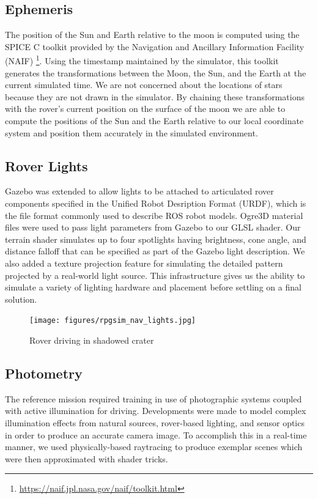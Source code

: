 \documentclass[twocolumn,letterpaper]{IEEEAerospaceCLS}  %
\begin{document}
\subsection{Ephemeris}
The position of the Sun and Earth relative to the moon is computed using the SPICE C toolkit provided by the Navigation and Ancillary Information Facility (NAIF) \footnote{\url{https://naif.jpl.nasa.gov/naif/toolkit.html}}.  
Using the timestamp maintained by the simulator, this toolkit generates the transformations between the Moon, the Sun, and the Earth at the current simulated time.  
We are not concerned about the locations of stars because they are not drawn in the simulator.
By chaining these transformations with the rover's current position on the surface of the moon we are able to compute the positions of the Sun and the Earth relative to our local coordinate system and position them accurately in the simulated environment.  

\subsection{Rover Lights}
Gazebo was extended to allow lights to be attached to articulated rover components specified in the Unified Robot Desription Format (URDF), which is the file format commonly used to describe ROS robot models.
Ogre3D material files were used to pass light parameters from Gazebo to our GLSL shader.  
Our terrain shader simulates up to four spotlights having brightness, cone angle, and distance falloff that can be specified as part of the Gazebo light description.
We also added a texture projection feature for simulating the detailed pattern projected by a real-world light source.  
This infrastructure gives us the ability to simulate a variety of lighting hardware and placement before settling on a final solution.
\begin{figure}[h!]
  \texttt{[image: figures/rpgsim\_nav\_lights.jpg]}
  \caption{Rover driving in shadowed crater}
  \label{fig:roverlights}
\end{figure}

\subsection {Photometry}
The reference mission required training in use of photographic systems coupled with active illumination for driving.  
Developments were made to model complex illumination effects from natural sources, rover-based lighting, and sensor optics in order to produce an accurate camera image.  
To accomplish this in a real-time manner, we used physically-based raytracing to produce exemplar scenes which were then approximated with shader tricks.  
\end{document}
